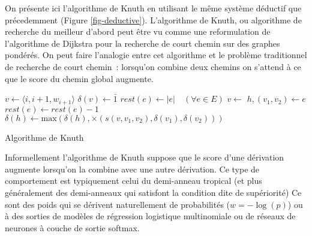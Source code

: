 \documentclass[11pt,openany]{book}
\begin{document}
On présente ici l'algorithme de Knuth en utilisant le même système déductif que précedemment (Figure \ref{fig-deductive}).
L'algorithme de Knuth, ou algorithme de recherche du meilleur d'abord peut être vu comme
 une reformulation de l'algorithme de Dijkstra pour la recherche de court chemin sur des graphes pondérés.
On peut faire l'analogie entre cet algorithme et le problème traditionnel de recherche de court chemin~:
lorsqu'on combine deux chemins on s'attend à ce que le score du chemin global augmente.


\begin{algorithm}[htbp]
\begin{algorithmic}
\State $v \gets \langle i,i+1,w_{i+1} \rangle$
\State $\delta(v) \gets \bar{1}$
\State  {}
\EndFor
\State   $rest(e) \gets |e| \quad (\forall e \in E)$ 
\State $v \gets $ 
\State $h, (v_1, v_2) \gets e$
\State $rest(e) \gets rest(e) - 1$
\State $\delta(h) \gets \text{max}( \delta(h),  \times(s(v,v_1,v_2),\delta(v_1),\delta(v_2)))$
\State {}
\EndIf
\EndFor
\EndWhile
\EndFunction
\end{algorithmic}
\caption{\label{algo-knuth} Algorithme de Knuth}
\end{algorithm}


Informellement l'algorithme de Knuth suppose que le score d'une dérivation augmente lorsqu'on la combine avec une autre dérivation.
Ce type de comportement est typiquement celui du demi-anneau tropical (et plus généralement des demi-anneaux qui satisfont 
la condition dite de supériorité)
Ce sont des poids qui se dérivent naturellement de probabilités 
($w = -\log(p)$) ou à des sorties de modèles de régression logistique multinomiale ou de réseaux de neurones
à couche de sortie softmax.
\end{document}
